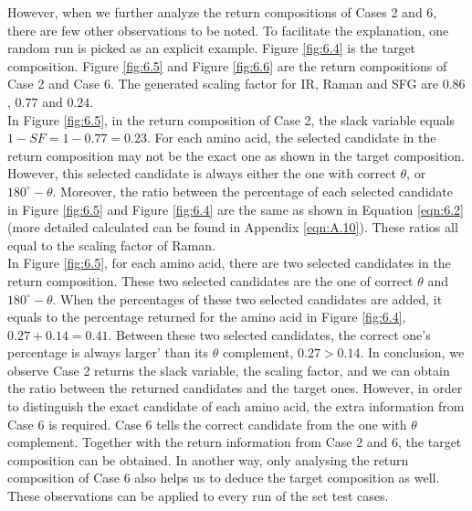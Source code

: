 However, when we further analyze the return compositions of Cases 2 and 6, there are few other observations to be noted. To facilitate the explanation, one random run is picked as an explicit example. Figure \ref{fig:6.4} is the target composition. Figure \ref{fig:6.5} and Figure \ref{fig:6.6} are the return compositions of Case 2 and Case 6. The generated scaling factor for IR, Raman and SFG are $0.86$, $0.77$ and $0.24$. \\

In Figure \ref{fig:6.5}, in the return composition of Case 2, the slack variable equals $1-SF = 1-0.77 = 0.23$. For each amino acid, the selected candidate in the return composition may not be the exact one as shown in the target composition. However, this selected candidate is always either the one with correct $\theta$, or $180^{\circ}-\theta$. Moreover, the ratio between the percentage of each selected candidate in Figure \ref{fig:6.5} and Figure \ref{fig:6.4} are the same as shown in Equation \ref{eqn:6.2} (more detailed calculated can be found in Appendix \ref{eqn:A.10}). These ratios all equal to the scaling factor of Raman. \\

In Figure \ref{fig:6.5}, for each amino acid, there are two selected candidates in the return composition. These two selected candidates are the one of correct $\theta$ and $180^{\circ}-\theta$. When the percentages of these two selected candidates are added, it equals to the percentage returned for the amino acid in Figure \ref{fig:6.4}, $0.27 + 0.14 = 0.41$. Between these two selected candidates, the correct one's percentage is always larger' than its $\theta$ complement, $0.27 > 0.14$. In conclusion, we observe Case 2 returns the slack variable, the scaling factor, and we can obtain the ratio between the returned candidates and the target ones. However, in order to distinguish the exact candidate of each amino acid, the extra information from Case 6 is required. Case 6 tells the correct candidate from the one with $\theta$ complement. Together with the return information from Case 2 and 6, the target composition can be obtained. In another way, only analysing the return composition of Case 6 also helps us to deduce the target composition as well. These observations can be applied to every run of the set test cases.\\


